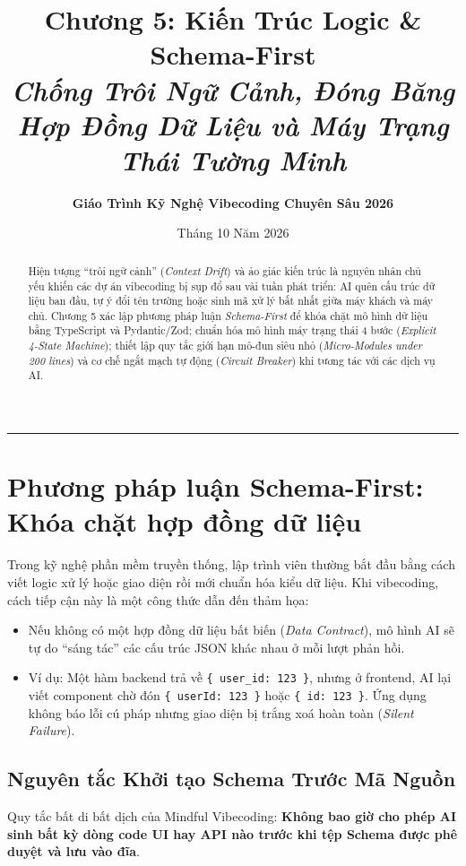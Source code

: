 \documentclass[a4paper,11pt]{article}
\title{\textbf{Chương 5: Kiến Trúc Logic \& Schema-First}\\[0.3em]
\large\textit{Chống Trôi Ngữ Cảnh, Đóng Băng Hợp Đồng Dữ Liệu và Máy Trạng Thái Tường Minh}}
\author{\textbf{Giáo Trình Kỹ Nghệ Vibecoding Chuyên Sâu 2026}}
\date{Tháng 10 Năm 2026}
\begin{document}
\maketitle

\begin{abstract}
Hiện tượng ``trôi ngữ cảnh'' (\textit{Context Drift}) và ảo giác kiến trúc là nguyên nhân chủ yếu khiến các dự án vibecoding bị sụp đổ sau vài tuần phát triển: AI quên cấu trúc dữ liệu ban đầu, tự ý đổi tên trường hoặc sinh mã xử lý bất nhất giữa máy khách và máy chủ. Chương 5 xác lập phương pháp luận \textit{Schema-First} để khóa chặt mô hình dữ liệu bằng TypeScript và Pydantic/Zod; chuẩn hóa mô hình máy trạng thái 4 bước (\textit{Explicit 4-State Machine}); thiết lập quy tắc giới hạn mô-đun siêu nhỏ (\textit{Micro-Modules under 200 lines}) và cơ chế ngắt mạch tự động (\textit{Circuit Breaker}) khi tương tác với các dịch vụ AI.
\end{abstract}

\vspace{1em}
\rule{\textwidth}{0.4pt}

\section{Phương pháp luận Schema-First: Khóa chặt hợp đồng dữ liệu}

Trong kỹ nghệ phần mềm truyền thống, lập trình viên thường bắt đầu bằng cách viết logic xử lý hoặc giao diện rồi mới chuẩn hóa kiểu dữ liệu. Khi vibecoding, cách tiếp cận này là một công thức dẫn đến thảm họa:
\begin{itemize}[leftmargin=1.5em]
    \item Nếu không có một hợp đồng dữ liệu bất biến (\textit{Data Contract}), mô hình AI sẽ tự do ``sáng tác'' các cấu trúc JSON khác nhau ở mỗi lượt phản hồi.
    \item Ví dụ: Một hàm backend trả về \texttt{\{ user\_id: 123 \}}, nhưng ở frontend, AI lại viết component chờ đón \texttt{\{ userId: 123 \}} hoặc \texttt{\{ id: 123 \}}. Ứng dụng không báo lỗi cú pháp nhưng giao diện bị trắng xoá hoàn toàn (\textit{Silent Failure}).
\end{itemize}

\subsection{Nguyên tắc Khởi tạo Schema Trước Mã Nguồn}
Quy tắc bất di bất dịch của Mindful Vibecoding: \textbf{Không bao giờ cho phép AI sinh bất kỳ dòng code UI hay API nào trước khi tệp Schema được phê duyệt và lưu vào đĩa}.
\end{document}
